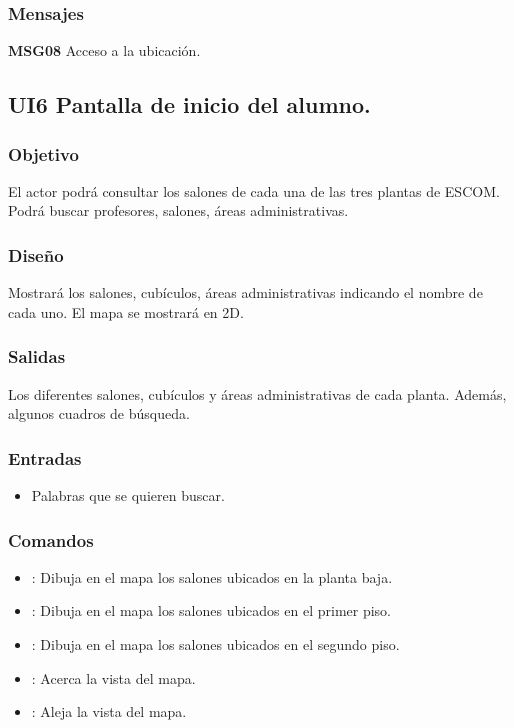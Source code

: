 \subsubsection{Mensajes}
\begin{Citemize}
	\item {\bf MSG08} Acceso a la ubicación.
\end{Citemize}

\pagebreak
\subsection{UI6 Pantalla de inicio del alumno.}

\subsubsection{Objetivo}
	El actor podrá consultar los salones de cada una de las tres plantas de ESCOM. Podrá buscar profesores,
	salones, áreas administrativas.

\subsubsection{Diseño}
	Mostrará los salones, cubículos, áreas administrativas indicando el nombre de cada uno.
	El mapa se mostrará en 2D.
	

\subsubsection{Salidas}

	Los diferentes salones, cubículos y áreas administrativas de cada planta. Además, algunos cuadros de 
	búsqueda.

\subsubsection{Entradas}

\begin{itemize}
	\item Palabras que se quieren buscar.
\end{itemize}

\subsubsection{Comandos}
\begin{itemize}
	\item {}: Dibuja en el mapa los salones ubicados en la planta baja.
	\item {}: Dibuja en el mapa los salones ubicados en el primer piso.
	\item {}: Dibuja en el mapa los salones ubicados en el segundo piso.
	\item \IUbutton{  +  }: Acerca la vista del mapa.
	\item \IUbutton{  -  }: Aleja la vista del mapa.
\end{itemize}

